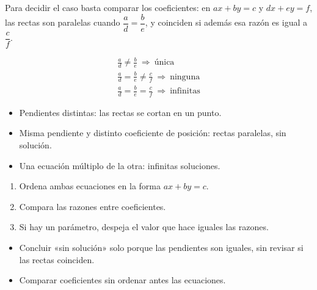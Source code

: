 \documentclass[10pt,a4paper,twocolumn]{article}
\begin{document}
Para decidir el caso basta comparar los coeficientes: en $ax+by=c$ y $dx+ey=f$, las rectas son paralelas cuando $\dfrac{a}{d}=\dfrac{b}{e}$, y coinciden si además esa razón es igual a $\dfrac{c}{f}$.

\begin{ley}[Criterio]
\begin{gather*}
\frac{a}{d}\neq\frac{b}{e}\ \Rightarrow\ \text{única} \\
\frac{a}{d}=\frac{b}{e}\neq\frac{c}{f}\ \Rightarrow\ \text{ninguna} \\
\frac{a}{d}=\frac{b}{e}=\frac{c}{f}\ \Rightarrow\ \text{infinitas}
\end{gather*}
\end{ley}

\begin{ideasclave}
\begin{itemize}
  \item Pendientes distintas: las rectas se cortan en un punto.
  \item Misma pendiente y distinto coeficiente de posición: rectas paralelas, sin solución.
  \item Una ecuación múltiplo de la otra: infinitas soluciones.
\end{itemize}
\end{ideasclave}

\begin{metodo}
\begin{enumerate}
  \item Ordena ambas ecuaciones en la forma $ax+by=c$.
  \item Compara las razones entre coeficientes.
  \item Si hay un parámetro, despeja el valor que hace iguales las razones.
\end{enumerate}
\end{metodo}

\begin{errorfrecuente}
\begin{itemize}
  \item Concluir «sin solución» solo porque las pendientes son iguales, sin revisar si las rectas coinciden.
  \item Comparar coeficientes sin ordenar antes las ecuaciones.
\end{itemize}
\end{errorfrecuente}
\end{document}
